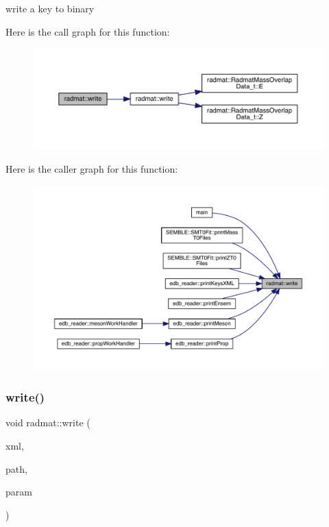 write a key to binary 

Here is the call graph for this function\+:
\nopagebreak
\begin{figure}[H]
\begin{center}
\leavevmode
\includegraphics[width=350pt]{d4/d83/namespaceradmat_a2ca0177bbaa4c0cfe7505fd997dae1f1_cgraph}
\end{center}
\end{figure}
Here is the caller graph for this function\+:
\nopagebreak
\begin{figure}[H]
\begin{center}
\leavevmode
\includegraphics[width=350pt]{d4/d83/namespaceradmat_a2ca0177bbaa4c0cfe7505fd997dae1f1_icgraph}
\end{center}
\end{figure}
\mbox{\label{namespaceradmat_adaf52a8cd9ebda9a7d68fbe9f69d20a9}} 
\subsubsection{\texorpdfstring{write()}{write()}\hspace{0.1cm}{\footnotesize\ttfamily [2/3]}}
{\footnotesize\ttfamily void radmat\+::write (\begin{DoxyParamCaption}\item[{A\+D\+A\+T\+X\+M\+L\+::\+X\+M\+L\+Writer \&}]{xml,  }\item[{const std\+::string \&}]{path,  }\item[{const \mbox{\hyperlink{structradmat_1_1RadmatExtendedKeyHadronNPartIrrep__t}{Radmat\+Extended\+Key\+Hadron\+N\+Part\+Irrep\+\_\+t}} \&}]{param }\end{DoxyParamCaption})}



